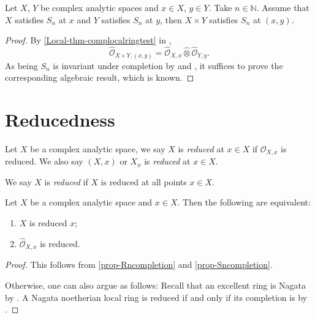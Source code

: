 \begin{proposition}\label{prop-Snproduct}
    Let $X$, $Y$ be complex analytic spaces and $x\in X$, $y\in Y$. Take $n\in \mathbb{N}$. Assume that $X$ satisfies $S_n$ at $x$ and $Y$ satisfies $S_n$ at $y$, then $X\times Y$ satisfies $S_n$ at $(x,y)$.
\end{proposition}
\begin{proof}
    By \cref{Local-thm-complocalringtest} in ,
    \[
        \hat{\mathcal{O}}_{X\times Y,(x,y)}=\hat{\mathcal{O}}_{X,x}\hat{\otimes}\hat{\mathcal{O}}_{Y,y}.  
    \]
    As being $S_n$ is invariant under completion by \cite[\href{https://stacks.math.columbia.edu/tag/07NW}{Tag 07NW}]{stacks-project} and \cite[\href{https://stacks.math.columbia.edu/tag/07NV}{Tag 07NV}]{stacks-project}, it suffices to prove the corresponding algebraic result, which is known.
\end{proof}

\section{Reducedness}
\begin{definition}
    Let $X$ be a complex analytic space, we say $X$ is \emph{reduced} at $x\in X$ if $\mathcal{O}_{X,x}$ is reduced. We also say $(X,x)$ or $X_x$ is \emph{reduced} at $x\in X$.

    We say $X$ is \emph{reduced} if $X$ is reduced at all points $x\in X$. 
\end{definition}

\begin{proposition}\label{prop-reducedcompletion}
    Let $X$ be a complex analytic space and $x\in X$.  Then the following are equivalent:
    \begin{enumerate}
        \item $X$ is reduced $x$;
        \item $\hat{\mathcal{O}}_{X,x}$ is reduced.
    \end{enumerate}
\end{proposition}
\begin{proof}
    This follows from \cref{prop-Rncompletion} and \cref{prop-Sncompletion}.
    
    Otherwise, one can also argue as follows: Recall that an excellent ring is Nagata by \cite[\href{https://stacks.math.columbia.edu/tag/07QV}{Tag 07QV}]{stacks-project}.
    A Nagata noetherian local ring is reduced if and only if its completion is by \cite[\href{https://stacks.math.columbia.edu/tag/07NZ}{Tag 07NZ}]{stacks-project}.
\end{proof}

